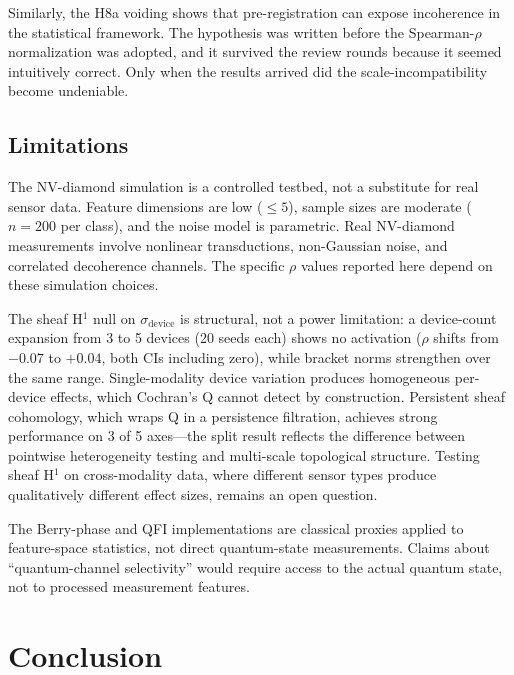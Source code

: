 \documentclass[11pt]{article}
\begin{document}
Similarly, the H8a voiding shows that pre-registration can expose
incoherence in the statistical framework.  The hypothesis was written
before the Spearman-$\rho$ normalization was adopted, and it survived
the review rounds because it seemed intuitively correct.  Only when the
results arrived did the scale-incompatibility become undeniable.

\subsection{Limitations}

The NV-diamond simulation is a controlled testbed, not a substitute for
real sensor data.  Feature dimensions are low ($\leq 5$), sample sizes
are moderate ($n = 200$ per class), and the noise model is parametric.
Real NV-diamond measurements involve nonlinear transductions,
non-Gaussian noise, and correlated decoherence channels.  The specific
$\rho$ values reported here depend on these simulation choices.

The sheaf H$^1$ null on $\sigma_\text{device}$ is structural, not a
power limitation: a device-count expansion from 3 to 5 devices (20
seeds each) shows no activation ($\rho$ shifts from $-0.07$ to
$+0.04$, both CIs including zero), while bracket norms strengthen
over the same range.  Single-modality device variation produces
homogeneous per-device effects, which Cochran's Q cannot detect by
construction.  Persistent sheaf cohomology, which wraps Q in a
persistence filtration, achieves strong performance on 3 of 5
axes---the split result reflects the difference between pointwise
heterogeneity testing and multi-scale topological structure.  Testing
sheaf H$^1$ on cross-modality data, where different sensor types
produce qualitatively different effect sizes, remains an open
question.

The Berry-phase and QFI implementations are classical proxies applied to
feature-space statistics, not direct quantum-state measurements.  Claims
about ``quantum-channel selectivity'' would require access to the actual
quantum state, not to processed measurement features.

\section{Conclusion}
\label{sec:conclusion}
\end{document}
